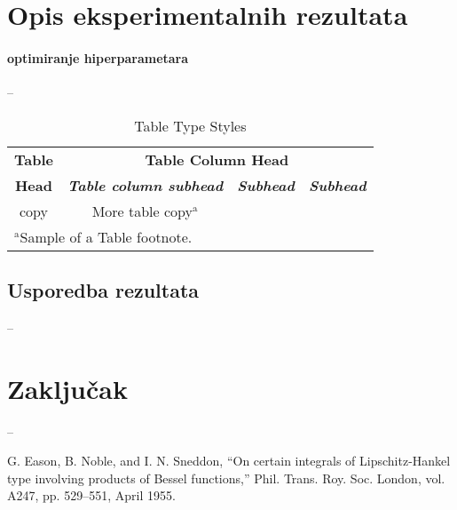 \documentclass[conference]{IEEEtran}
\begin{document}
\section{Opis eksperimentalnih rezultata}\label{FAT}
\paragraph{optimiranje hiperparametara}
--

\begin{table}[htbp]
\caption{Table Type Styles}
\begin{center}
\begin{tabular}{|c|c|c|c|}
\hline
\textbf{Table}&\multicolumn{3}{|c|}{\textbf{Table Column Head}} \\
\cline{2-4} 
\textbf{Head} & \textbf{\textit{Table column subhead}}& \textbf{\textit{Subhead}}& \textbf{\textit{Subhead}} \\
\hline
copy& More table copy$^{\mathrm{a}}$& &  \\
\hline
\multicolumn{4}{l}{$^{\mathrm{a}}$Sample of a Table footnote.}
\end{tabular}
\label{tab1}
\end{center}
\end{table}

\subsection{Usporedba rezultata}
--

\section{Zaključak}
--


\begin{thebibliography}{00}
 G. Eason, B. Noble, and I. N. Sneddon, ``On certain integrals of Lipschitz-Hankel type involving products of Bessel functions,'' Phil. Trans. Roy. Soc. London, vol. A247, pp. 529--551, April 1955.
\end{thebibliography}
\end{document}

